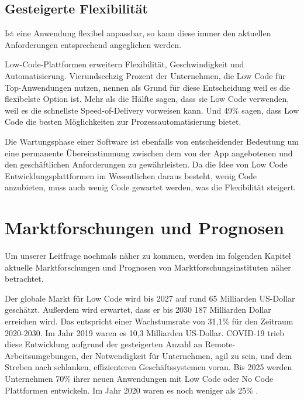 \documentclass[12pt]{article} %
\begin{document}
	\subsection{Gesteigerte Flexibilität}
	Ist eine Anwendung flexibel anpassbar, so kann diese immer den aktuellen Anforderungen entsprechend angeglichen werden.
	
	Low-Code-Plattformen erweitern Flexibilität, Geschwindigkeit und Automatisierung. Vierundsechzig Prozent der Unternehmen, die Low Code für Top-Anwendungen nutzen, nennen als Grund für diese Entscheidung weil es die flexibelste Option ist. 
	Mehr als die Hälfte sagen, dass sie Low Code verwenden, weil es die schnellste Speed-of-Delivery vorweisen kann. Und 49\% sagen, dass Low Code die besten Möglichkeiten zur Prozessautomatisierung bietet. \autocite{EmmaVanPelt.2019} \newline
	
	Die Wartungsphase einer Software ist ebenfalls von entscheidender Bedeutung um eine permanente Übereinstimmung zwischen dem von der App angebotenen und den geschäftlichen Anforderungen zu gewährleisten. Da die Idee von Low Code Entwicklungsplattformen im Wesentlichen daraus besteht, wenig Code anzubieten, muss auch wenig Code gewartet werden, was die Flexibilität steigert. \autocite{Sanchis.2020b}


	
	\section{Marktforschungen und Prognosen} \label{Zukunftsaussicht}
	Um unserer Leitfrage nochmals näher zu kommen, werden im folgenden Kapitel aktuelle Marktforschungen und Prognosen von Marktforschungsinstituten näher betrachtet. \newline

	Der globale Markt für Low Code wird bis 2027 auf rund 65 Milliarden US-Dollar geschätzt. Außerdem wird erwartet, dass er bis 2030 187 Milliarden Dollar erreichen wird. Das entspricht einer Wachstumsrate von 31,1\% für den Zeitraum 2020-2030.
	Im Jahr 2019 waren es 10,3 Milliarden US-Dollar. COVID-19 trieb diese Entwicklung aufgrund der gesteigerten Anzahl an Remote-Arbeitsumgebungen, der Notwendigkeit für Unternehmen, agil zu sein, und dem Streben nach schlanken, effizienteren Geschäftssystemen voran. \autocite{KevinShuler.2023}
	Bis 2025 werden Unternehmen 70\% ihrer neuen Anwendungen mit Low Code oder No Code Plattformen entwickeln. Im Jahr 2020 waren es noch weniger als 25\% \autocite{KevinShuler.2023}. \newline
	
\end{document}

